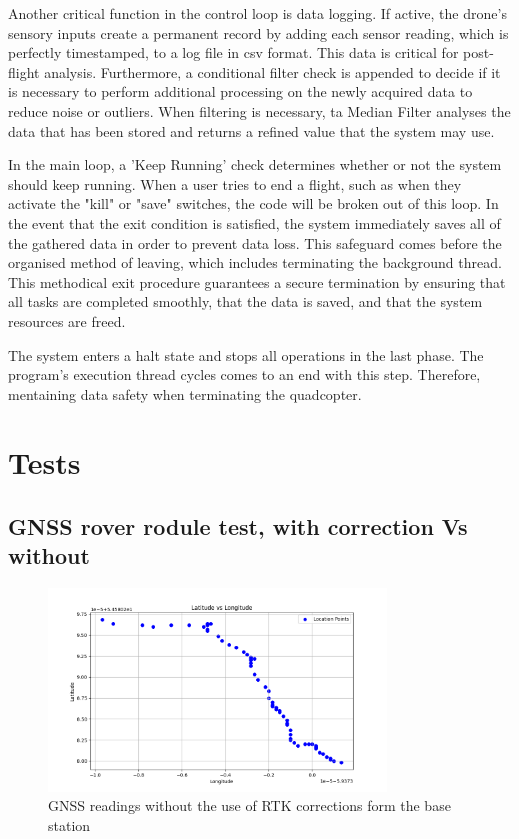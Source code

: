 \documentclass{article}
\begin{document}
Another critical function in the control loop is data logging. If active, the
drone's sensory inputs create a permanent record by adding each sensor reading,
which is perfectly timestamped, to a log file in csv format. This data is
critical for post-flight analysis. Furthermore, a conditional filter check is
appended to decide if it is necessary to perform additional processing on the
newly acquired data to reduce noise or outliers. When filtering is necessary, ta
Median Filter analyses the data that has been stored and returns a refined value
that the system may use.

In the main loop, a 'Keep Running' check determines whether or not the system
should keep running. When a user tries to end a flight, such as when they
activate the "kill" or "save" switches, the code will be broken out of this
loop. In the event that the exit condition is satisfied, the system immediately
saves all of the gathered data in order to prevent data loss. This safeguard
comes before the organised method of leaving, which includes terminating the
background thread. This methodical exit procedure guarantees a secure
termination by ensuring that all tasks are completed smoothly, that the data is
saved, and that the system resources are freed.

The system enters a halt state and stops all operations in the last phase. The
program’s execution thread cycles comes to an end with this step. Therefore,
mentaining data safety when terminating the quadcopter.

\section{Tests}\label{tests}

\subsection{GNSS rover rodule test, with correction Vs
without}\label{GNSS_rover_module}
\begin{figure}[H]
  \centering
  \includegraphics[width=0.8\textwidth]{Pictures/GNSS_no_RTK.png}
  \caption{GNSS readings without the use of RTK corrections form the base station}
  \label{fig:GNSS_no_RTK}
\end{figure}
\end{document}

